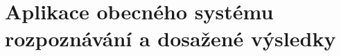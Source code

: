 \section{Aplikace obecného systému rozpoznávání a dosažené výsledky}
\label{chap:construction:results}






